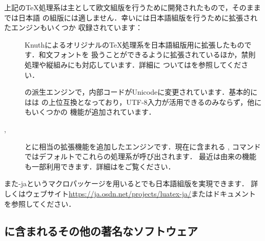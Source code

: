 \documentclass[uplatex,dvipdfmx,tombow]{jsarticle}
\begin{document}
%
上記の\TeX 処理系は主として欧文組版を行うために開発されたもので，そのままでは日本語
の組版には適しません．幸い\TL には日本語組版を行うために拡張されたエンジンもいくつか
収録されています：
%
\begin{description}
\item[\pTeX]
Knuthによるオリジナルの\TeX 処理系を日本語組版用に拡張したものです．和文フォントを
扱うことができるように拡張されているほか，禁則処理や縦組みにも対応しています．詳細に
ついてはを参照してください．

\item[\upTeX]
\pTeX の派生エンジンで，内部コードがUnicodeに変更されています．基本的には\upTeX は
\pTeX の上位互換となっており，UTF-8入力が活用できるのみならず，他にもいくつかの
機能が追加されています．

\item[\epTeX, \eupTeX]
\pTeX と\upTeX に\eTeX 相当の拡張機能を追加したエンジンです．現在\TL に含まれる
, コマンドではデフォルトでこれらの処理系が呼び出されます．
最近は\pdfTeX 由来の機能も一部利用できます．詳細はをご覧ください．
\end{description}
%
また\LuaTeX-jaというマクロパッケージを用いると\LuaTeX でも日本語組版を実現できます．
詳しくはウェブサイト\url{https://ja.osdn.net/projects/luatex-ja/}またはドキュメント
を参照してください．

\subsection{\TL に含まれるその他の著名なソフトウェア}
\end{document}
